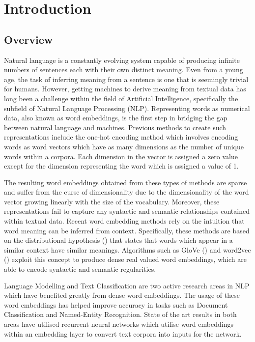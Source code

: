 \chapter{Introduction}
\label{chap:intro}
\section{Overview}
Natural language is a constantly evolving system capable of  producing infinite numbers of sentences each with their own distinct meaning. Even from a young age, the task of inferring meaning from a sentence is one that is seemingly trivial for humans. However, getting machines to derive meaning from textual data has long been a challenge within the field of Artificial Intelligence, specifically the subfield of Natural Language Processing (NLP). Representing words as numerical data, also known as word embeddings, is the first step in bridging the gap between natural language and machines. Previous methods to create such representations include the one-hot encoding method which involves encoding words as word vectors which have as many dimensions as the number of unique words within a corpora. Each dimension in the vector is assigned a zero value except for the dimension representing the word which is assigned a value of 1.

\noindent
\newline
The resulting word embeddings obtained from these types of methods are sparse and suffer from the curse of dimensionality due to the dimensionality of the word vector growing linearly with the size of the vocabulary. Moreover, these representations fail to capture any syntactic and semantic relationships contained within textual data. Recent word embedding methods rely on the intuition that word meaning can be inferred from context. Specifically, these methods are based on the distributional hypothesis (\cite{Harris1954}) that states that words which appear in a similar context have similar meanings. Algorithms such as GloVe (\cite{Pennington2014}) and word2vec (\cite{Mikolov2013}) exploit this concept to produce dense real valued word embeddings, which are able to encode syntactic and semantic regularities.

\noindent
\newline
Language Modelling and Text Classification are two active research areas in NLP which have benefited greatly from dense word embeddings. The usage of these word embeddings has helped improve accuracy in tasks such as Document Classification and Named-Entity Recognition. State of the art results in both areas have utilised recurrent neural networks which utilise word embeddings within an embedding layer to convert text corpora into inputs for the network.

